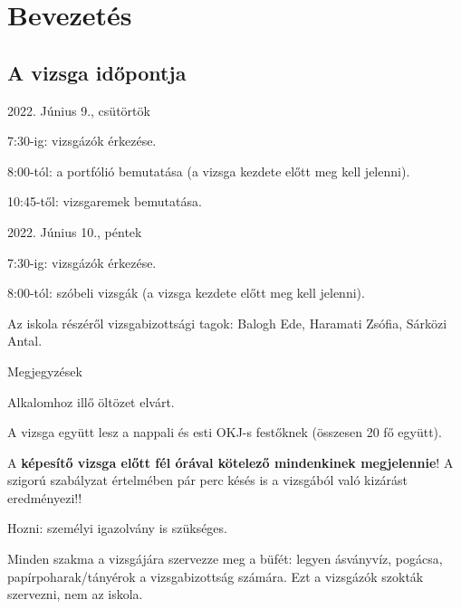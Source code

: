 \chapter{Bevezetés} %
\label{ch:bevezetes}

\section{A vizsga időpontja}

\begin{compactitem}
	\item 2022. Június 9., csütörtök
	\begin{compactitem} 
		\item 7:30-ig: vizsgázók érkezése. 
		\item 8:00-tól: a portfólió bemutatása (a vizsga kezdete előtt meg kell jelenni).
		\item 10:45-től: vizsgaremek bemutatása.
	\end{compactitem}
	
	\item 2022. Június 10., péntek
	\begin{compactitem}
		\item 7:30-ig: vizsgázók érkezése. 
		\item 8:00-tól: szóbeli vizsgák (a vizsga kezdete előtt meg kell jelenni).
		\item Az iskola részéről vizsgabizottsági tagok: Balogh Ede, Haramati Zsófia, Sárközi Antal.
	\end{compactitem}

	\item Megjegyzések
	\begin{compactitem}
		\item Alkalomhoz illő öltözet elvárt.
		\item A vizsga együtt lesz a nappali és esti OKJ-s festőknek (összesen 20 fő együtt).
		\item A \textbf{képesítő vizsga előtt fél órával kötelező mindenkinek megjelennie}! A szigorú szabályzat értelmében pár perc késés is a vizsgából való kizárást eredményezi!!
		\item Hozni: személyi igazolvány is szükséges.
		\item Minden szakma a vizsgájára szervezze meg a büfét: legyen ásványvíz, pogácsa, papírpoharak/tányérok a vizsgabizottság számára. Ezt a vizsgázók szokták szervezni, nem az iskola.
	\end{compactitem}
\end{compactitem}

